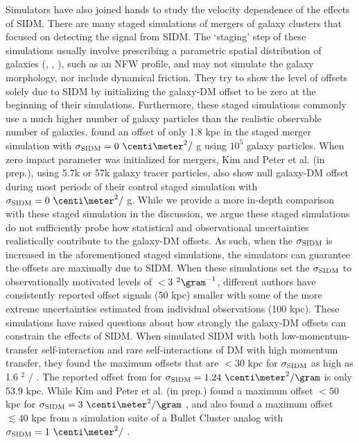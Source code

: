 Simulators have also joined hands to study the velocity dependence of the
effects of SIDM. There are many staged simulations of mergers of galaxy
clusters that focused on detecting the signal from
SIDM. The `staging' step of these simulations usually involve prescribing a parametric  
spatial distribution of galaxies  
(\citealt{Randall2008d}, \citealt{Kahlhoefer14}, \citealt{Robertson2016}), 
such as an NFW profile, 
and may not simulate the galaxy morphology, nor include dynamical
friction. 
They try to show the level of offsets solely due to SIDM \citep{Kahlhoefer14}  
by initializing the galaxy-DM offset to be zero at the beginning of their 
simulations. Furthermore, these staged simulations commonly use a much higher number of 
galaxy particles than the realistic observable number of galaxies. 
\cite{Randall2008d} found an offset of only 1.8 kpc in the staged merger
simulation with $\sigma_{\rm SIDM} = 0~\centi\meter^2 /$ g using $10^5$ 
galaxy particles. 
When zero impact parameter was initialized for mergers, Kim and Peter et al.
(in prep.), using 5.7k or 57k galaxy tracer particles, also show 
null galaxy-DM offset during most periods of their control staged simulation 
with $\sigma_{\rm
SIDM} = 0~\centi\meter^2 /$ g. While we provide a more in-depth comparison with
these staged simulation in the discussion, we argue 
these staged simulations do not sufficiently probe  
how statistical and observational uncertainties realistically contribute to 
the galaxy-DM offsets. 
As such, when the $\sigma_{\rm
SIDM}$ is increased in the aforementioned staged simulations, the simulators 
can guarantee the offsets are maximally due to SIDM.
When these simulations set the $\sigma_{\rm SIDM}$ to observationally motivated 
levels of $< 3$ \centi\meter$^2 \gram^{-1}$, 
different authors have consistently reported offset signals (50 kpc) 
smaller with some of the more extreme uncertainties estimated from individual observations (100 kpc). 
These simulations have raised questions about how strongly the galaxy-DM offsets 
can constrain the effects of SIDM.
When \cite{Kahlhoefer14} simulated SIDM with both low-momentum-transfer 
self-interaction 
and rare self-interactions of DM with high momentum transfer, they found the maximum 
offsets that are $< 30$ kpc for $\sigma_{\rm SIDM}$ as high as 1.6
\centi\meter$^2$ / \gram.
The reported offset from \cite{Randall2008d}
for $\sigma_{\rm SIDM} = 1.24~\centi\meter^2 / \gram$ is only 53.9 kpc. 
While Kim and Peter et al. (in prep.) found a maximum offset $< 50$ kpc for 
$\sigma_{\rm SIDM} = 3~\centi\meter^2 / \gram$ ,
and \cite{Robertson2016} also found a maximum offset $\lesssim 40$ kpc  
 from a simulation suite of a Bullet Cluster analog 
 with $\sigma_{\rm SIDM} = 1~\centi\meter^2 /$ \gram.

